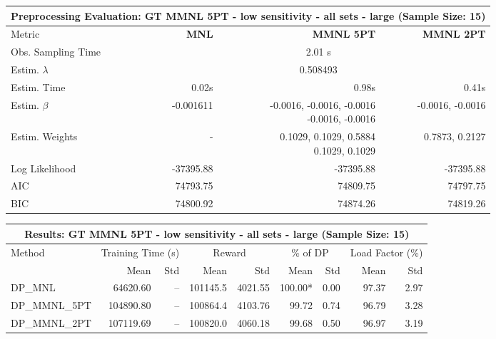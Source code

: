 
\begin{samepage}
\begin{center}
  \small
  \begin{tabular}{l|r|r|r}
    \toprule
    \multicolumn{4}{c}{\textbf{Preprocessing Evaluation: GT MMNL 5PT - low sensitivity - all sets - large (Sample Size: 15)}} \\
    \midrule
    Metric & \textbf{MNL} & \textbf{MMNL 5PT} & \textbf{MMNL 2PT} \\
    \midrule
    Obs. Sampling Time & \multicolumn{3}{c}{2.01 s} \\
    Estim. $\lambda$ & \multicolumn{3}{c}{0.508493} \\
    Estim. Time & 0.02s & 0.98s & 0.41s \\
    Estim. $\beta$ & -0.001611 & \makecell[tr]{-0.0016, -0.0016, -0.0016 \\ -0.0016, -0.0016} & -0.0016, -0.0016 \\
    Estim. Weights & - & \makecell[tr]{0.1029, 0.1029, 0.5884 \\ 0.1029, 0.1029} & 0.7873, 0.2127 \\
    Log Likelihood & -37395.88 & -37395.88 & -37395.88 \\
    AIC & 74793.75 & 74809.75 & 74797.75 \\
    BIC & 74800.92 & 74874.26 & 74819.26 \\
    \bottomrule
  \end{tabular}
\end{center}
\begin{center}
  \small
  \begin{tabular}{l|rr|rr|rr|rr}
    \toprule
    \multicolumn{9}{c}{\textbf{Results: GT MMNL 5PT - low sensitivity - all sets - large (Sample Size: 15)}} \\
    \midrule
    Method & \multicolumn{2}{c|}{Training Time (s)} & \multicolumn{2}{c|}{Reward} & \multicolumn{2}{c|}{\% of DP} & \multicolumn{2}{c}{Load Factor (\%)} \\
    & Mean & Std & Mean & Std & Mean & Std & Mean & Std \\
    \midrule
    DP\_MNL      & 64620.60 &    -- &   101145.5 &    4021.55 & 100.00* &    0.00 &   97.37 &    2.97 \\
    DP\_MMNL\_5PT & 104890.80 &    -- &   100864.4 &    4103.76 &   99.72 &    0.74 &   96.79 &    3.28 \\
    DP\_MMNL\_2PT & 107119.69 &    -- &   100820.0 &    4060.18 &   99.68 &    0.50 &   96.97 &    3.19 \\

\end{tabular}
\end{center}
\end{samepage}
